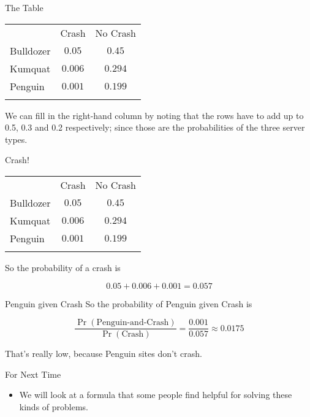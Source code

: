 \documentclass[
  ignorenonframetext,
]{beamer}
\providecommand{\tightlist}{%
  \setlength{\itemsep}{0pt}\setlength{\parskip}{0pt}}
\renewcommand{\,}{\text{, }}
\begin{document}
\begin{frame}{The Table}
\protect\hypertarget{the-table-4}{}
\begin{longtable}[]{@{}lcc@{}}
\toprule
& Crash & No Crash \\ \addlinespace
\midrule
\endhead
Bulldozer & \(0.05\) & \(0.45\) \\ \addlinespace
Kumquat & \(0.006\) & \(0.294\) \\ \addlinespace
Penguin & \(0.001\) & \(0.199\) \\ \addlinespace
\bottomrule
\end{longtable}

We can fill in the right-hand column by noting that the rows have to add
up to 0.5, 0.3 and 0.2 respectively; since those are the probabilities
of the three server types.
\end{frame}

\begin{frame}{Crash!}
\protect\hypertarget{crash}{}
\begin{longtable}[]{@{}lcc@{}}
\toprule
& Crash & No Crash \\ \addlinespace
\midrule
\endhead
Bulldozer & \(0.05\) & \(0.45\) \\ \addlinespace
Kumquat & \(0.006\) & \(0.294\) \\ \addlinespace
Penguin & \(0.001\) & \(0.199\) \\ \addlinespace
\bottomrule
\end{longtable}

So the probability of a crash is

\[
0.05 + 0.006 + 0.001 = 0.057
\]
\end{frame}

\begin{frame}{Penguin given Crash}
\protect\hypertarget{penguin-given-crash}{}
So the probability of Penguin given Crash is

\[
\frac{\Pr(\text{Penguin-and-Crash})}{\Pr(\text{Crash})} = \frac{0.001}{0.057} \approx 0.0175
\]

\pause

That's really low, because Penguin sites don't crash.
\end{frame}

\begin{frame}{For Next Time}
\protect\hypertarget{for-next-time}{}
\begin{itemize}
\tightlist
\item
  We will look at a formula that some people find helpful for solving
  these kinds of problems.
\end{itemize}
\end{frame}
\end{document}
